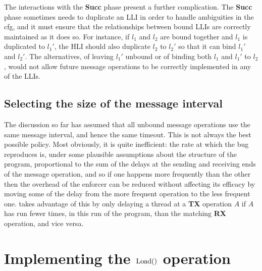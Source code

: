 The interactions with the \textbf{Succ} phase present a further
complication.  The \textbf{Succ} phase sometimes needs to duplicate an
LLI in order to handle ambiguities in the \gls{cfg}, and it must
ensure that the relationships between bound LLIs are correctly
maintained as it does so.  For instance, if $l_1$ and $l_2$ are bound
together and $l_1$ is duplicated to $l_1'$, the HLI should also
duplicate $l_2$ to $l_2'$ so that it can bind $l_1'$ and $l_2'$.  The
alternatives, of leaving $l_1'$ unbound or of binding both $l_1$ and
$l_1'$ to $l_2$, would not allow future message operations to be
correctly implemented in any of the LLIs.

\subsection{Selecting the size of the message interval}
\label{sect:using:timeout_balancing}


The discussion so far has assumed that all unbound message operations
use the same message interval, and hence the same timeout.  This is
not always the best possible policy.  Most obviously, it is quite
inefficient: the rate at which the bug reproduces is, under some
plausible assumptions about the structure of the program, proportional
to the sum of the delays at the sending and receiving ends of the
message operation, and so if one happens more frequently than the
other then the overhead of the enforcer can be reduced without
affecting its efficacy by moving some of the delay from the more
frequent operation to the less frequent one.  {\Implementation} takes
advantage of this by only delaying a thread at a \textbf{TX} operation
$A$ if $A$ has run fewer times, in this run of the program, than the
matching \textbf{RX} operation, and vice versa.

\section{Implementing the $\mathrm{Load}()$ operation}

